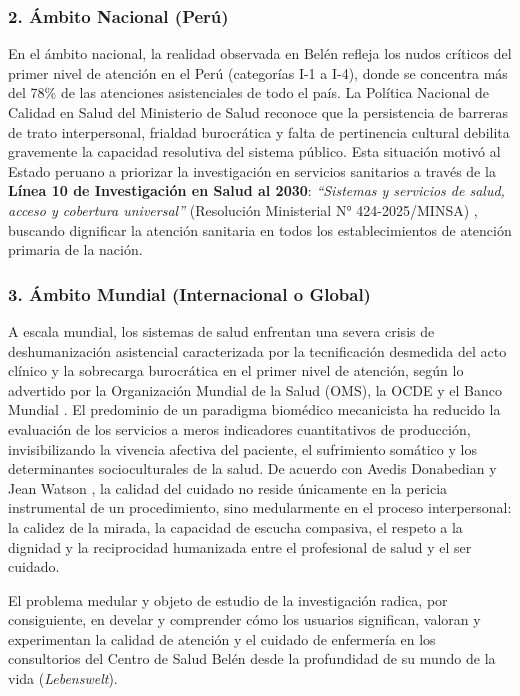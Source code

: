 \subsubsection*{2. Ámbito Nacional (Perú)}
En el ámbito nacional, la realidad observada en Belén refleja los nudos críticos del primer nivel de atención en el Perú (categorías I-1 a I-4), donde se concentra más del 78\% de las atenciones asistenciales de todo el país. La Política Nacional de Calidad en Salud del Ministerio de Salud \cite{minsacalidad2021} reconoce que la persistencia de barreras de trato interpersonal, frialdad burocrática y falta de pertinencia cultural debilita gravemente la capacidad resolutiva del sistema público. Esta situación motivó al Estado peruano a priorizar la investigación en servicios sanitarios a través de la \textbf{Línea 10 de Investigación en Salud al 2030}: \textit{“Sistemas y servicios de salud, acceso y cobertura universal”} (Resolución Ministerial N° 424-2025/MINSA) \cite{minsainv2025}, buscando dignificar la atención sanitaria en todos los establecimientos de atención primaria de la nación.

\subsubsection*{3. Ámbito Mundial (Internacional o Global)}
A escala mundial, los sistemas de salud enfrentan una severa crisis de deshumanización asistencial caracterizada por la tecnificación desmedida del acto clínico y la sobrecarga burocrática en el primer nivel de atención, según lo advertido por la Organización Mundial de la Salud (OMS), la OCDE y el Banco Mundial \cite{who2018}. El predominio de un paradigma biomédico mecanicista ha reducido la evaluación de los servicios a meros indicadores cuantitativos de producción, invisibilizando la vivencia afectiva del paciente, el sufrimiento somático y los determinantes socioculturales de la salud. De acuerdo con Avedis Donabedian \cite{donabedian1980, donabedian2005} y Jean Watson \cite{watson2008}, la calidad del cuidado no reside únicamente en la pericia instrumental de un procedimiento, sino medularmente en el proceso interpersonal: la calidez de la mirada, la capacidad de escucha compasiva, el respeto a la dignidad y la reciprocidad humanizada entre el profesional de salud y el ser cuidado.

El problema medular y objeto de estudio de la investigación radica, por consiguiente, en develar y comprender cómo los usuarios significan, valoran y experimentan la calidad de atención y el cuidado de enfermería en los consultorios del Centro de Salud Belén desde la profundidad de su mundo de la vida (\textit{Lebenswelt}).


